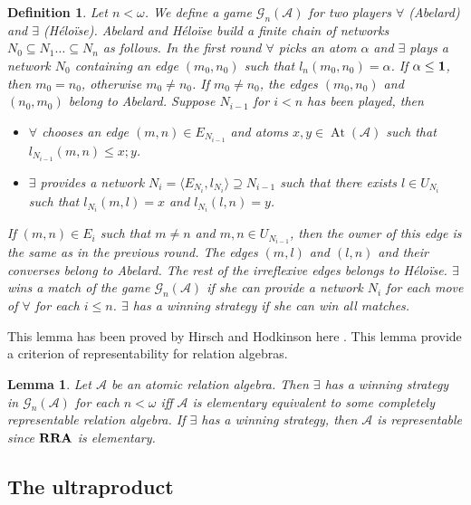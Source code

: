 \documentclass[a4paper]{article}
\theoremstyle{defin}
\newtheorem{defin}{Definition}
\theoremstyle{theorem}
\theoremstyle{prop}
\theoremstyle{lemma}
\newtheorem{lemma}{Lemma}
\theoremstyle{ex}
\theoremstyle{col}
\theoremstyle{claim}
\begin{document}
\begin{defin}
  Let $n < \omega$. We define a game $\mathcal{G}_n(\mathcal{A})$ for two players $\forall$ (Abelard) and $\exists$ (H\'{e}lo\"{i}se). Abelard and H\'{e}lo\"{i}se build a finite chain of networks $N_0 \subseteq N_1 \dots \subseteq N_n$ as follows. In the first round $\forall$ picks an atom $\alpha$ and $\exists$ plays a network $N_0$ containing an edge $(m_0, n_0)$ such that $l_n(m_0, n_0) = \alpha$. If $\alpha \leq {\bf 1}$, then $m_0 = n_0$, otherwise $m_0 \neq n_0$. If $m_0 \neq n_0$, the edges $(m_0, n_0)$ and $(n_0, m_0)$ belong to Abelard. Suppose $N_{i-1}$ for $i < n$ has been played, then
  \begin{itemize}
    \item $\forall$ chooses an edge $(m, n) \in E_{N_{i - 1}}$ and atoms $x, y \in \operatorname{At}(\mathcal{A})$ such that $l_{N_{i - 1}}(m,n) \leq x ; y$.
    \item $\exists$ provides a network $N_i = \langle E_{N_i}, l_{N_i} \rangle \supseteq N_{i - 1}$ such that there exists
    $l \in U_{N_i}$ such that $l_{N_i}(m, l) = x$ and $l_{N_i}(l, n) = y$.
  \end{itemize}
  If $(m,n) \in E_i$ such that $m \neq n$ and $m, n \in U_{N_{i - 1}}$, then the owner of this edge is the same as in the previous round.
  The edges $(m, l)$ and $(l, n)$ and their converses belong to Abelard. The rest of the irreflexive edges belongs to H\'{e}lo\"{i}se. $\exists$ wins a match of the game $\mathcal{G}_n(\mathcal{A})$ if she can provide a network $N_i$ for each move of $\forall$ for each $i \leq n$.
  $\exists$ has a winning strategy if she can win all matches.
\end{defin}

This lemma has been proved by Hirsch and Hodkinson here \cite{hirsch1997step}. This lemma provide a criterion of representability for relation algebras.

\begin{lemma} \label{win}
  Let $\mathcal{A}$ be an atomic relation algebra. Then $\exists$ has a winning strategy in $\mathcal{G}_n({\mathcal{A}})$ for each $n < \omega$ iff $\mathcal{A}$ is elementary equivalent to some completely representable relation algebra. If $\exists$ has a winning strategy, then $\mathcal{A}$ is representable since ${\bf RRA}$ is elementary.
\end{lemma}

\subsection{The ultraproduct}
\end{document}

